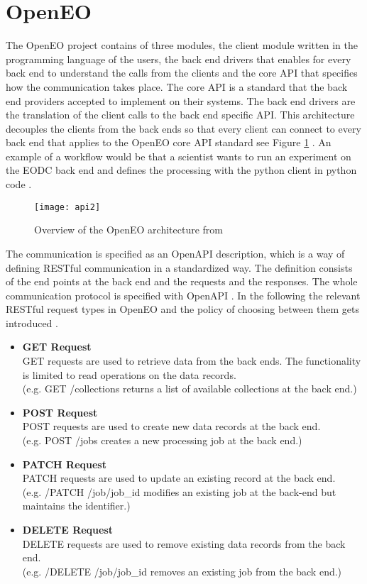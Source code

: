\documentclass[draft,final]{vutinfth} %
\begin{document}
\section{OpenEO}\label{OpenEO}
The OpenEO project contains of three modules, the client module written in the programming language of the users, the back end drivers that enables for every back end to understand the calls from the clients and the core API that specifies how the communication takes place. The core API is a standard that the back end providers accepted to implement on their systems. The back end drivers are the translation of the client calls to the back end specific API. This architecture decouples the clients from the back ends so that every client can connect to every back end that applies to the OpenEO core API standard see Figure \ref{fig:api2} . An example of a workflow would be that a scientist wants to run an experiment on the EODC back end and defines the processing with the python client in python code \cite{openeo}.  

\begin{figure}[h]
	\centering
	\texttt{[image: api2]}
	\caption{Overview of the OpenEO architecture from \cite{openeo_github} }
	\label{fig:api2} %
\end{figure}


The communication is specified as an OpenAPI description, which is a way of defining RESTful communication in a standardized way. The definition consists of the end points at the back end and the requests and the responses. The whole communication protocol is specified with OpenAPI \cite{openapi}. 
In the following the relevant RESTful request types in OpenEO and the policy of choosing between them gets introduced \cite{openeo_github}.

\begin{itemize}
	\item \textbf{GET Request} \\
	GET requests are used to retrieve data from the back ends. The functionality is limited to read operations on the data records. \\(e.g. GET /collections returns a list of available collections at the back end.)
	\item \textbf{POST Request} \\ 
	POST requests are used to create new data records at the back end.  \\(e.g. POST /jobs creates a new processing job at the back end.)  
	\item \textbf{PATCH Request} \\
	PATCH requests are used to update an existing record at the back end. \\(e.g. /PATCH /job/{job\_id} modifies an existing job at the back-end but maintains the identifier.)
	\item \textbf{DELETE Request} \\ 
	DELETE requests are used to remove existing data records from the back end. \\(e.g. /DELETE /job/{job\_id} removes an existing job from the back end.)
\end{itemize}
\end{document}
